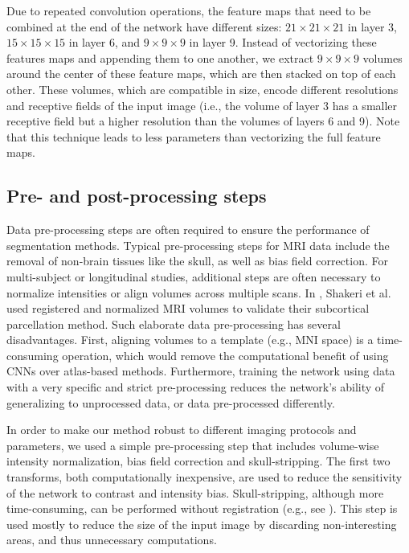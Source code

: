 \documentclass[twoside,fleqn,espcrc2]{elsarticle}
\newcommand{\vold}[1]{$#1\!\times\!#1\!\times\!#1$}
\begin{document}
Due to repeated convolution operations, the feature maps that need to be combined at the end of the network have different sizes: \vold{21} in layer 3, \vold{15} in layer 6, and \vold{9} in layer 9. Instead of vectorizing these features maps and appending them to one another, we extract \vold{9} volumes around the center of these feature maps, which are then stacked on top of each other. These volumes, which are compatible in size, encode different resolutions and receptive fields of the input image (i.e., the volume of layer 3 has a smaller receptive field but a higher resolution than the volumes of layers 6 and 9). Note that this technique leads to less parameters than vectorizing the full feature maps.
 

\subsection{Pre- and post-processing steps}
\label{ssec:preproc}

Data pre-processing steps are often required to ensure the performance of segmentation methods. Typical pre-processing steps for MRI data include the removal of non-brain tissues like the skull, as well as bias field correction. For multi-subject or longitudinal studies, additional steps are often necessary to normalize intensities or align volumes across multiple scans. In \cite{shakeri2016sub}, Shakeri et al. used registered and normalized MRI volumes to validate their subcortical parcellation method. Such elaborate data pre-processing has several disadvantages. First, aligning volumes to a template (e.g., MNI space) is a time-consuming operation, which would remove the computational benefit of using CNNs over atlas-based methods. Furthermore, training the network using data with a very specific and strict pre-processing reduces the network's ability of generalizing to unprocessed data, or data pre-processed differently.

In order to make our method robust to different imaging protocols and parameters, we used a simple pre-processing step that includes volume-wise intensity normalization, bias field correction and skull-stripping. The first two transforms, both computationally inexpensive, are used to reduce the sensitivity of the network to contrast and intensity bias. Skull-stripping, although more time-consuming, can be performed without registration (e.g., see \cite{smith2002fast}). This step is used mostly to reduce the size of the input image by discarding non-interesting areas, and thus unnecessary computations.   
\end{document}

